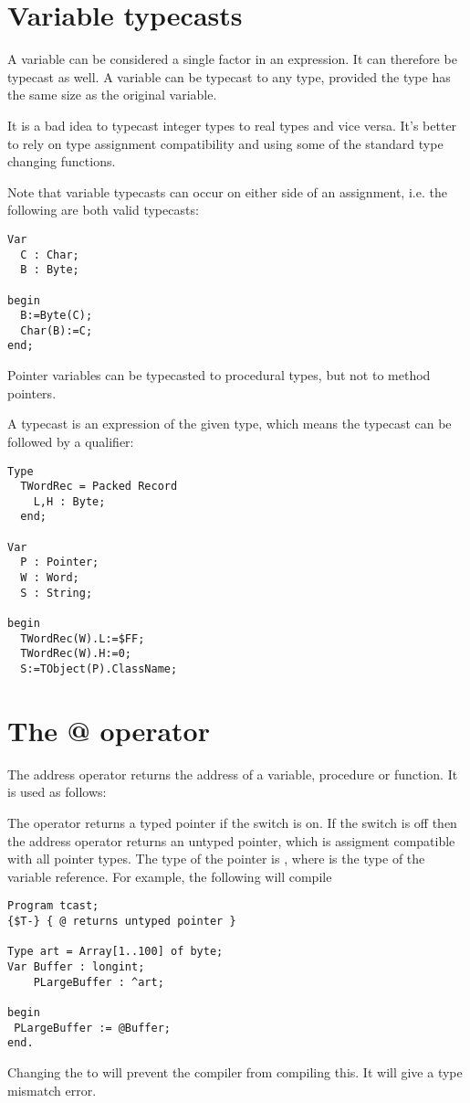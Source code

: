 \section{Variable typecasts}
A variable can be considered a single factor in an expression. It can
therefore be typecast as well. A variable can be typecast to any type,
provided the type has the same size as the original variable. 

It is a bad idea to typecast integer types to real types and vice versa.
It's better to rely on type assignment compatibility and using some of the
standard type changing functions.

Note that variable typecasts can occur on either side of an assignment,
i.e. the following are both valid typecasts:
\begin{verbatim}
Var
  C : Char;
  B : Byte;

begin
  B:=Byte(C);
  Char(B):=C;
end;
\end{verbatim}
Pointer variables can be typecasted to procedural types, but not
to method pointers.

A typecast is an expression of the given type, which means the
typecast can be followed by a qualifier:
\begin{verbatim}
Type 
  TWordRec = Packed Record
    L,H : Byte;
  end;

Var
  P : Pointer;
  W : Word;
  S : String;

begin
  TWordRec(W).L:=$FF;
  TWordRec(W).H:=0;
  S:=TObject(P).ClassName;
\end{verbatim}

\section{The @ operator}
The address operator  returns the address of a variable, procedure
or function. It is used as follows:

The  operator returns a typed pointer if the  switch is on.
If the  switch is off then the address operator returns an untyped
pointer, which is assigment compatible with all pointer types. The type of
the pointer is , where  is the type of the variable
reference.
For example, the following will compile
\begin{verbatim}
Program tcast;
{$T-} { @ returns untyped pointer }

Type art = Array[1..100] of byte;
Var Buffer : longint;
    PLargeBuffer : ^art;

begin
 PLargeBuffer := @Buffer;
end.
\end{verbatim}
Changing the  to  will prevent the compiler from
compiling this. It will give a type mismatch error.


